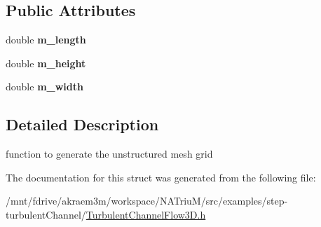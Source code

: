\subsection*{Public Attributes}
\begin{DoxyCompactItemize}
\item 
\hypertarget{structnatrium_1_1TurbulentChannelFlow3D_1_1UnstructuredGridFunc_a543f7c7ac4610029cea442940fe323ac}{
double {\bfseries m\_\-length}}
\label{structnatrium_1_1TurbulentChannelFlow3D_1_1UnstructuredGridFunc_a543f7c7ac4610029cea442940fe323ac}

\item 
\hypertarget{structnatrium_1_1TurbulentChannelFlow3D_1_1UnstructuredGridFunc_aac61ff96d62a4aaef70580161f0de8da}{
double {\bfseries m\_\-height}}
\label{structnatrium_1_1TurbulentChannelFlow3D_1_1UnstructuredGridFunc_aac61ff96d62a4aaef70580161f0de8da}

\item 
\hypertarget{structnatrium_1_1TurbulentChannelFlow3D_1_1UnstructuredGridFunc_a6c5856421a2c2b7371bfbb6f3134dfa6}{
double {\bfseries m\_\-width}}
\label{structnatrium_1_1TurbulentChannelFlow3D_1_1UnstructuredGridFunc_a6c5856421a2c2b7371bfbb6f3134dfa6}

\end{DoxyCompactItemize}


\subsection{Detailed Description}
function to generate the unstructured mesh grid 

The documentation for this struct was generated from the following file:\begin{DoxyCompactItemize}
\item 
/mnt/fdrive/akraem3m/workspace/NATriuM/src/examples/step-\/turbulentChannel/\hyperlink{TurbulentChannelFlow3D_8h}{TurbulentChannelFlow3D.h}\end{DoxyCompactItemize}
